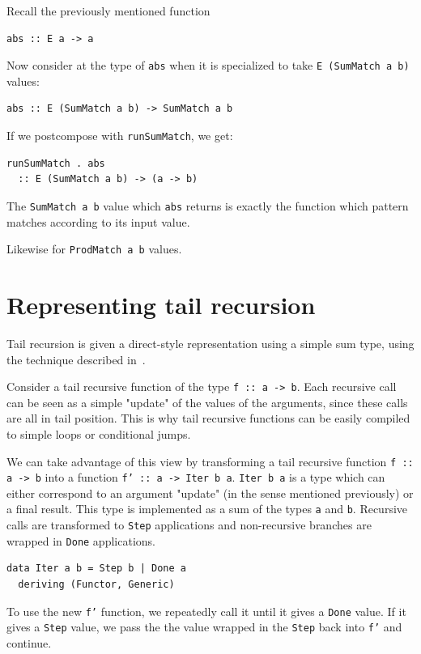 \documentclass[runningheads, a4paper]{llncs}
\newcommand{\ttt}{\texttt}
\begin{document}
Recall the previously mentioned function

\begin{lstlisting}
abs :: E a -> a
\end{lstlisting}

Now consider at the type of \ttt{abs} when it is specialized to take
\ttt{E (SumMatch a b)} values:

\begin{lstlisting}
abs :: E (SumMatch a b) -> SumMatch a b
\end{lstlisting}

If we postcompose with \ttt{runSumMatch}, we get:

\begin{lstlisting}
runSumMatch . abs
  :: E (SumMatch a b) -> (a -> b)
\end{lstlisting}

The \ttt{SumMatch a b} value which \ttt{abs} returns is exactly the function
which pattern matches according to its input value.

Likewise for \ttt{ProdMatch a b} values.

\section{Representing tail recursion}
Tail recursion is given a direct-style representation using a simple sum type,
using the technique described in~\cite{Grebe:2017:RSD:3136040.3136048}.

Consider a tail recursive function of the type \ttt{f :: a -> b}. Each recursive
call can be seen as a simple "update" of the values of the arguments, since
these calls are all in tail position. This is why tail recursive functions
can be easily compiled to simple loops or conditional jumps.

We can take advantage of this view by transforming a tail recursive function
\ttt{f :: a -> b} into a function \ttt{f' :: a -> Iter b a}. \ttt{Iter b a} is a
type which can either correspond to an argument "update" (in the sense mentioned
previously) or a final result. This type is implemented as a sum of the types
\ttt{a} and \ttt{b}. Recursive calls are transformed to \ttt{Step} applications
and non-recursive branches are wrapped in \ttt{Done} applications.

\begin{lstlisting}
data Iter a b = Step b | Done a
  deriving (Functor, Generic)
\end{lstlisting}

To use the new \ttt{f'} function, we repeatedly call it until it gives a
\ttt{Done} value. If it gives a \ttt{Step} value, we pass the the value wrapped
in the \ttt{Step} back into \ttt{f'} and continue.
\end{document}
